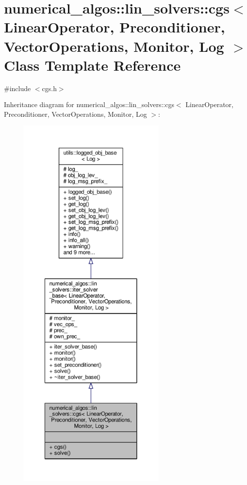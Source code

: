 \hypertarget{classnumerical__algos_1_1lin__solvers_1_1cgs}{\section{numerical\-\_\-algos\-:\-:lin\-\_\-solvers\-:\-:cgs$<$ Linear\-Operator, Preconditioner, Vector\-Operations, Monitor, Log $>$ Class Template Reference}
\label{classnumerical__algos_1_1lin__solvers_1_1cgs}
}


{\ttfamily \#include $<$cgs.\-h$>$}



Inheritance diagram for numerical\-\_\-algos\-:\-:lin\-\_\-solvers\-:\-:cgs$<$ Linear\-Operator, Preconditioner, Vector\-Operations, Monitor, Log $>$\-:\nopagebreak
\begin{figure}[H]
\begin{center}
\leavevmode
\includegraphics[height=550pt]{classnumerical__algos_1_1lin__solvers_1_1cgs__inherit__graph}
\end{center}
\end{figure}


